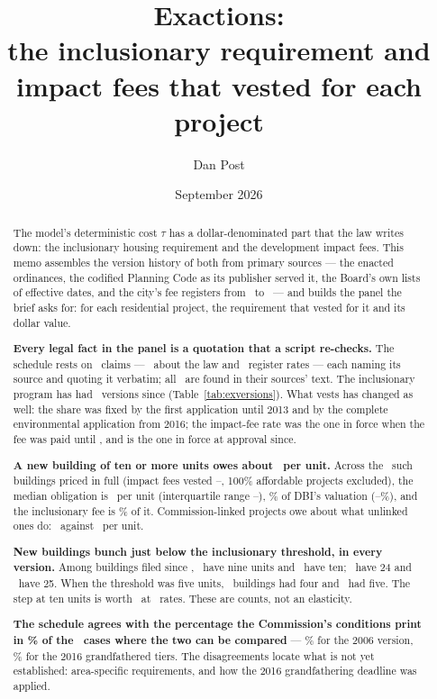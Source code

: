\documentclass[11pt]{article}
\title{Exactions:\\
\large the inclusionary requirement and impact fees that vested for each project}
\author{Dan Post}
\date{September 2026}
\begin{document}
\maketitle

\begin{abstract}
\noindent
The model's deterministic cost $\tau$ has a dollar-denominated part that the law writes down:
the inclusionary housing requirement and the development impact fees. This memo assembles the
version history of both from primary sources --- the enacted ordinances, the codified Planning
Code as its publisher served it, the Board's own lists of effective dates, and the city's fee
registers from \exRegFirst\ to \exRegLast\ --- and builds the panel the brief asks for: for each residential
project, the requirement that vested for it and its dollar value.

\medskip\noindent
\textbf{Every legal fact in the panel is a quotation that a script re-checks.} The schedule
rests on \exClaims\ claims --- \exLegalClaims\ about the law and \exRegisterClaims\ register
rates --- each naming its source and quoting it verbatim; all \exClaimsVerified\ are found in
their sources' text. The inclusionary program has had \exVersions\ versions since
 (Table~\ref{tab:exversions}). What vests has changed as well: the share was fixed by the first
application until 2013 and by the complete environmental application from 2016; the impact-fee
rate was the one in force when the fee was paid until , and is the one in
force at approval since.

\medskip\noindent
\textbf{A new building of ten or more units owes about \exPuMed\ per unit.} Across the
\exPriced\ such buildings priced in full (impact fees vested \exRegFirst--\exRegLast, 100\%
affordable projects excluded), the median obligation is \exPuMed\ per unit (interquartile range
\exPuLo--\exPuHi), \exShareMed\% of DBI's valuation (\exShareLo--\exShareHi\%), and the
inclusionary fee is \exInclShare\% of it. Commission-linked projects owe about what unlinked ones
do: \exPuMedLinked\ against \exPuMedNot\ per unit.

\medskip\noindent
\textbf{New buildings bunch just below the inclusionary threshold, in every version.} Among
buildings filed since , \exNineA\ have nine units and \exTenA\ have ten;
\exTwentyFourA\ have 24 and \exTwentyFiveA\ have 25. When the threshold was five units,
\exFourSix\ buildings had four and \exFiveSix\ had five. The step at ten units is worth
\exStepTen\ at \exStepYear\ rates. These are counts, not an elasticity.

\medskip\noindent
\textbf{The schedule agrees with the percentage the Commission's conditions print in
\exCrossAgree\% of the \exCrossN\ cases where the two can be compared} --- \exCrossSix\% for the
2006 version, \exCrossGf\% for the 2016 grandfathered tiers. The disagreements locate what is
not yet established: area-specific requirements, and how the 2016 grandfathering deadline was
applied.
\end{abstract}
\end{document}
